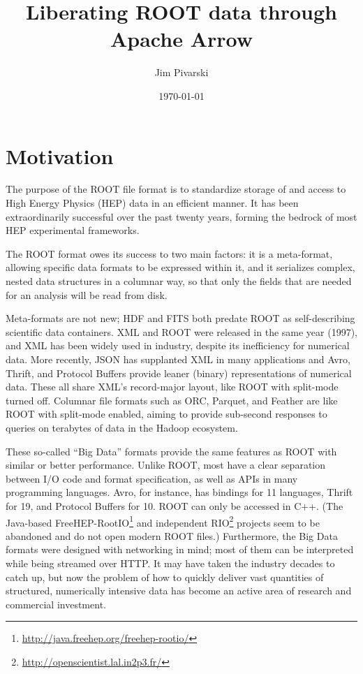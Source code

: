 \documentclass{article}
\title{Liberating ROOT data through Apache Arrow}
\author{Jim Pivarski}
\date{\today}
\begin{document}
\maketitle

\section*{Motivation}

The purpose of the ROOT file format is to standardize storage of and access to High Energy Physics (HEP) data in an efficient manner. It has been extraordinarily successful over the past twenty years, forming the bedrock of most HEP experimental frameworks.

The ROOT format owes its success to two main factors: it is a meta-format, allowing specific data formats to be expressed within it, and it serializes complex, nested data structures in a columnar way, so that only the fields that are needed for an analysis will be read from disk.

Meta-formats are not new; HDF and FITS both predate ROOT as self-describing scientific data containers. XML and ROOT were released in the same year (1997), and XML has been widely used in industry, despite its inefficiency for numerical data. More recently, JSON has supplanted XML in many applications and Avro, Thrift, and Protocol Buffers provide leaner (binary) representations of numerical data. These all share XML's record-major layout, like ROOT with split-mode turned off. Columnar file formats such as ORC, Parquet, and Feather are like ROOT with split-mode enabled, aiming to provide sub-second responses to queries on terabytes of data in the Hadoop ecosystem.

These so-called ``Big Data'' formats provide the same features as ROOT with similar or better performance. Unlike ROOT, most have a clear separation between I/O code and format specification, as well as APIs in many programming languages. Avro, for instance, has bindings for 11 languages, Thrift for 19, and Protocol Buffers for 10. ROOT can only be accessed in C++. (The Java-based FreeHEP-RootIO\footnote{\url{http://java.freehep.org/freehep-rootio/}} and independent RIO\footnote{\url{http://openscientist.lal.in2p3.fr/}} projects seem to be abandoned and do not open modern ROOT files.) Furthermore, the Big Data formats were designed with networking in mind; most of them can be interpreted while being streamed over HTTP. It may have taken the industry decades to catch up, but now the problem of how to quickly deliver vast quantities of structured, numerically intensive data has become an active area of research and commercial investment.
\end{document}

